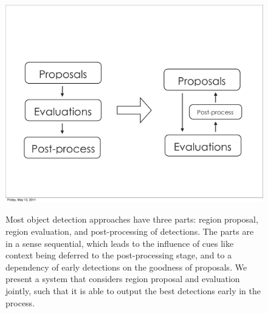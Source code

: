 \begin{figure}[htb]
  \caption{Most object detection approaches have three parts: region proposal, region evaluation, and post-processing of detections. The parts are in a sense sequential, which leads to the influence of cues like context being deferred to the post-processing stage, and to a dependency of early detections on the goodness of proposals. We present a system that considers region proposal and evaluation jointly, such that it is able to output the best detections early in the process.}
  \centering
    \includegraphics[width=0.9\linewidth]{../figures/architecture_concept.pdf}
  \label{fig:architecture_concept}
\end{figure}

